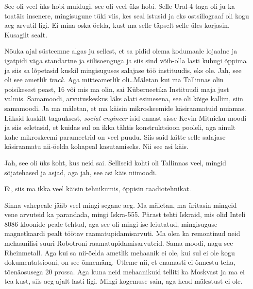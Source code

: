 
See oli veel üks hobi muidugi, see oli veel üks hobi. Selle Ural-4 taga oli ju ka toatäis insenere, mingisugune tüki viis, kes seal istusid ja eks ostsillograaf oli kogu aeg arvutil ligi. Ei mina oska öelda, kust ma selle täpselt selle üles korjasin. Kusagilt sealt. 


Nõuka ajal süsteemne algas ju sellest, et sa pidid olema kodumaale lojaalne ja igatpidi väga standartne ja siilisoenguga ja siis sind võib-olla lasti kuhugi õppima ja siis sa lõpetasid kuskil mingisuguses salajase töö instituudis, eks ole. Jah, see oli see ametlik \emph{track}. Aga mitteametlik oli\ldots Mäletan kui ma Tallinnas olin poisikesest peast,  16 või mis ma olin, sai Küberneetika Instituudi maja just valmis. Samamoodi, arvutuskeskus läks alati esimesena, see oli kõige kallim,  siin samamoodi. Ja  ma mäletan, et ma käisin  mikroskeemide käsiraamatuid nuiamas. Läksid kuskilt tagauksest, \emph{social engineer}-isid ennast sisse Kevin Mitnicku moodi ja siis seletasid, et kuidas sul on ikka tähtis konstruktsioon pooleli, aga ainult kahe mikroskeemi parameetrid on veel puudu. Siis said kätte selle salajase käsiraamatu nii-öelda kohapeal kasutamiseks. Nii see asi käis. 


Jah, see oli üks koht, kus neid sai. Selliseid kohti oli Tallinnas veel,  mingid sõjatehased ja asjad, aga jah, see asi käis niimoodi. 


Ei, siis ma ikka veel käisin tehnikumis, õppisin raadiotehnikat. 


Sinna vahepeale jääb veel mingi segane aeg. Ma mäletan, ma üritasin mingeid vene arvuteid ka parandada, mingi Iskra-555.  Pärast tehti Iskraid, mis olid Inteli 8086 kloonide peale tehtud, aga see oli mingi ise leiutatud, mingisuguse magnetkaardi pealt töötav raamatupidamisarvuti. Ma olen ka remontinud neid mehaanilisi suuri Robotroni raamatupidamisarvuteid. Sama moodi, nagu see Rheinmetall. Aga kui sa nii-öelda ametlik mehaanik ei ole, kui sul ei ole kogu dokumentatsiooni, on see õnnemäng. Ütleme nii, et enamasti ei õnnestu teha, tõenäosusega 20 prossa. Aga kuna neid mehaanikuid telliti ka Moskvast ja ma ei tea kust, siis aeg-ajalt lasti ligi. Mingi kogemuse sain, aga head mälestust ei ole. 

